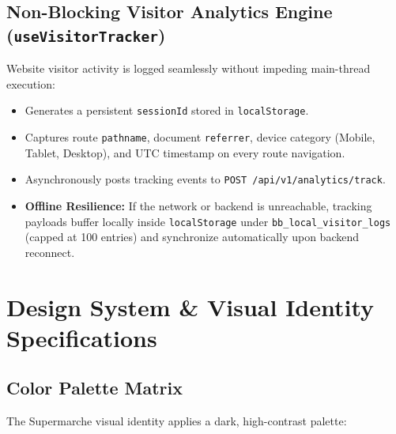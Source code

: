 \documentclass[11pt,a4paper]{article}
\begin{document}
\subsection{Non-Blocking Visitor Analytics Engine (\texttt{useVisitorTracker})}
Website visitor activity is logged seamlessly without impeding main-thread execution:
\begin{itemize}
    \item Generates a persistent \texttt{sessionId} stored in \texttt{localStorage}.
    \item Captures route \texttt{pathname}, document \texttt{referrer}, device category (Mobile, Tablet, Desktop), and UTC timestamp on every route navigation.
    \item Asynchronously posts tracking events to \texttt{POST /api/v1/analytics/track}.
    \item \textbf{Offline Resilience:} If the network or backend is unreachable, tracking payloads buffer locally inside \texttt{localStorage} under \texttt{bb\_local\_visitor\_logs} (capped at 100 entries) and synchronize automatically upon backend reconnect.
\end{itemize}

\newpage

\section{Design System \& Visual Identity Specifications}

\subsection{Color Palette Matrix}
The Supermarche visual identity applies a dark, high-contrast palette:
\end{document}
